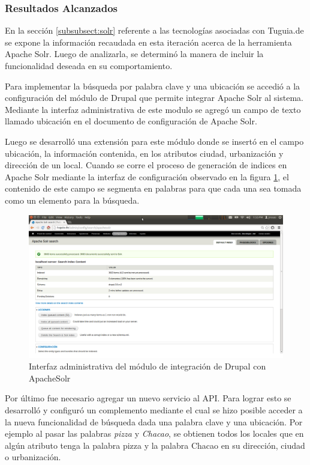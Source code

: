 \subsubsection{Resultados Alcanzados}

En la sección \ref{subsubsect:solr} referente a las tecnologías asociadas con Tuguia.de se expone la información recaudada en esta iteración acerca de la herramienta Apache Solr. Luego de analizarla, se determinó la manera de incluir la funcionalidad deseada en su comportamiento.

Para implementar la búsqueda por palabra clave y una ubicación se accedió a la configuración del módulo de Drupal que permite integrar Apache Solr al sistema. Mediante la interfaz administrativa de este modulo se agregó un campo de texto llamado ubicación en el documento de configuración de Apache Solr. 

Luego se desarrolló una extensión para este módulo donde se insertó en el campo ubicación, la información contenida, en los atributos ciudad, urbanización y dirección de un local. Cuando se corre el proceso de generación de indices en Apache Solr mediante la interfaz de configuración observado en la figura \ref{img:index_drupal}, el contenido de este campo se segmenta en palabras para que cada una sea tomada como un elemento para la búsqueda.

\begin{figure}[h]
	\begin{center}
		\includegraphics[scale=0.35]{imagenes/solr.png}
	\end{center}
	\caption{
		\label{img:index_drupal}
		Interfaz administrativa del módulo de integración de Drupal con ApacheSolr
	}
\end{figure}

Por último fue necesario agregar un nuevo servicio al API. Para lograr esto se desarrolló y configuró un complemento mediante el cual se hizo posible acceder a la nueva funcionalidad de  búsqueda dada una palabra clave y una ubicación. Por ejemplo al pasar las palabras \textit{pizza} y \textit{Chacao}, se obtienen todos los locales que en algún atributo tenga la palabra pizza y la palabra Chacao en su dirección, ciudad o urbanización.

